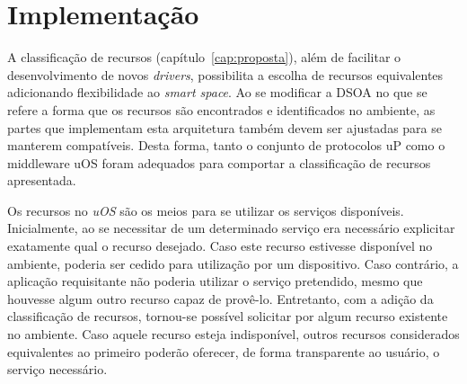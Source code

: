 \chapter{Implementação}

A classificação de recursos (capítulo~\ref{cap:proposta}), além de facilitar o desenvolvimento de novos \emph{drivers}, possibilita a escolha de recursos equivalentes adicionando flexibilidade ao \emph{smart space}. Ao se modificar a DSOA no que se refere a forma que os recursos são encontrados e identificados no ambiente, as partes que implementam esta arquitetura também devem ser ajustadas para se manterem compatíveis. Desta forma, tanto o conjunto de protocolos uP como o middleware uOS foram adequados para comportar a classificação de recursos apresentada.

Os recursos no \emph{uOS} são os meios para se utilizar os serviços disponíveis. Inicialmente, ao se necessitar de um determinado serviço era necessário explicitar exatamente qual o recurso desejado. Caso este recurso estivesse disponível no ambiente, poderia ser cedido para utilização por um dispositivo. Caso contrário, a aplicação requisitante não poderia utilizar o serviço pretendido, mesmo que houvesse algum outro recurso capaz de provê-lo. Entretanto, com a adição da classificação de recursos, tornou-se possível solicitar por algum recurso existente no ambiente. Caso aquele recurso esteja indisponível, outros recursos considerados equivalentes ao primeiro poderão oferecer, de forma transparente ao usuário, o serviço necessário.


